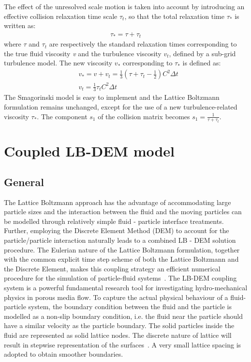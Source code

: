 \documentclass[12pt,twoside]{tuhhproc-en}
\begin{document}
The effect of the unresolved scale motion is taken into account by introducing an effective collision relaxation time scale $\tau_{t}$, so that the total relaxation time $\tau_{*}$ is written as:
\begin{align}
\tau_{*}=\tau + \tau_{t}
\end{align}
where $\tau$ and $\tau_{t}$ are respectively the standard relaxation times corresponding to the true fluid viscosity \textit{v} and the turbulence viscosity $\mathit{v}_{\mathit{t}}$, defined by a sub-grid turbulence model. The new viscosity $\mathit{v}_{*}$ corresponding to $\tau_{*}$ is defined as:
\begin{align}
& \mathit{v}_{*}=\mathit{v}+\mathit{v}_{\mathit{t}}=\frac{1}{3}(\tau+\tau_{t}-\frac{1}{2})\mathit{C}^{2} \Delta \mathit{t}  \\
& \mathit{v}_{\mathit{t}}=\frac{1}{3}\tau_{\mathit{t}}\mathit{C}^{2} \Delta \textit{t}
\end{align}
The Smagorinski model is easy to implement and the Lattice Boltzmann formulation remains unchanged, except for the use of a new turbulence-related viscosity $\tau_{*}$. The component $s_1$ of the collision matrix becomes $s_1 = \frac{1}{\tau+\tau_t}$.


\section{Coupled LB-DEM model}
\subsection{General}
The Lattice Boltzmann approach has the advantage of accommodating large particle sizes and the interaction between the fluid and the moving particles can be modelled through relatively simple fluid - particle interface treatments. Further, employing the Discrete Element Method (DEM) to account for the particle/particle interaction naturally leads to a combined LB - DEM solution procedure. The Eulerian nature of the Lattice Boltzmann formulation, together with the common explicit time step scheme of both the Lattice Boltzmann and the Discrete Element, makes this coupling strategy an efficient numerical procedure for the simulation of particle-fluid systems~\citep{Cook2004}. The LB-DEM coupling system is a powerful fundamental research tool for investigating hydro-mechanical physics in porous media flow. To capture the actual physical behaviour of a fluid-particle system, the boundary condition between the fluid and the particle is modelled as a non-slip boundary condition, i.e. the fluid near the particle should have a similar velocity as the particle boundary. The solid particles inside the fluid are represented as solid lattice nodes. The discrete nature of lattice will result in stepwise representation of the surfaces~\citep{Kumar2015}. A very small lattice spacing is adopted to obtain smoother boundaries.
\end{document}
